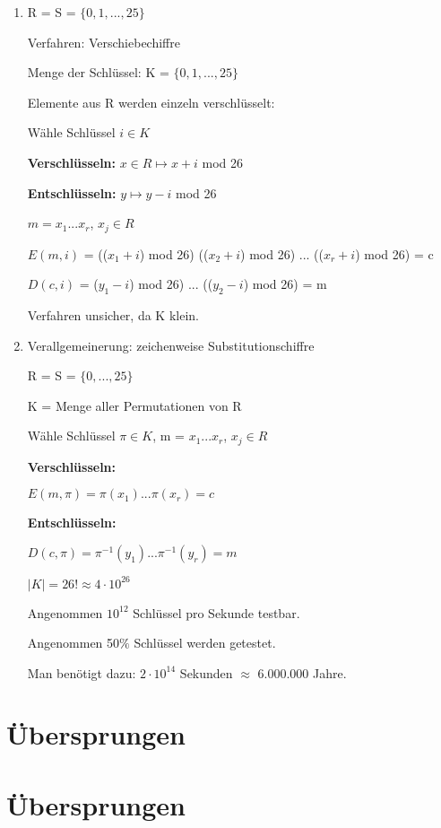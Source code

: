 \begin{enumerate}[label=(\alph*)]
  \item R = S = $\{0,1,...,25\}$

  Verfahren: Verschiebechiffre

  Menge der Schlüssel: K = $\{0,1,...,25\}$

  Elemente aus R werden einzeln verschlüsselt:

  Wähle Schlüssel $i \in K$

  \textbf{Verschlüsseln:}  $x \in R \mapsto x+i$ mod 26

  \textbf{Entschlüsseln:} $y \mapsto y-i$ mod 26

  $m = x_1 ... x_r$, $x_j \in R$

  $E(m,i)$ = (($x_1 +i$) mod 26) (($x_2 +i$) mod 26) ... (($x_r + i$) mod 26) = c

  $D(c,i)$ = ($y_1-i$) mod 26) ... (($y_2 -i$) mod 26) = m 

  Verfahren unsicher, da K klein.

  \item Verallgemeinerung: zeichenweise Substitutionschiffre

  R = S = $\{0, ..., 25\}$

  K = Menge aller Permutationen von R

  Wähle Schlüssel $\pi \in K$, m = $x_1 ... x_r$, $x_j \in R$

  \textbf{Verschlüsseln:} 

  $E(m, \pi) = \pi(x_1) ... \pi(x_r) = c$

  \textbf{Entschlüsseln:}

  $D(c, \pi) = \pi^{-1}(y_1) ... \pi^{-1}(y_r) = m$

  $|K| = 26! \approx 4 \cdot 10^{26}$

  Angenommen $10^{12}$ Schlüssel pro Sekunde testbar.

  Angenommen 50$\%$ Schlüssel werden getestet. 

  Man benötigt dazu: $2 \cdot 10^{14}$ Sekunden $\approx$ 6.000.000 Jahre.
\end{enumerate}

\section{Übersprungen}
\section{Übersprungen}

